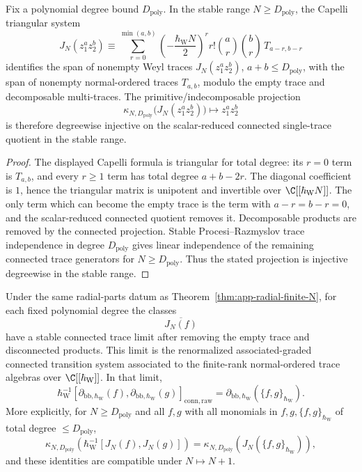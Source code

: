 \begin{lem}
\label{lem:app-radial-connected-projection}
  Fix a polynomial degree bound \(D_{\mathrm{poly}}\).  In the stable range
  \(N\geq D_{\mathrm{poly}}\), the Capelli triangular system
  \[
    J_N(z_1^az_2^b)\equiv
      \sum_{r=0}^{\min(a,b)}
        \left(-\frac{\hbar_{\mathrm{W}} N}{2}\right)^r
        r!\binom ar\binom br\,T_{a-r,b-r}
  \]
  identifies the span of nonempty Weyl traces \(J_N(z_1^az_2^b)\),
  \(a+b\leq D_{\mathrm{poly}}\), with the span of nonempty normal-ordered traces
  \(T_{a,b}\), modulo the empty trace and decomposable multi-traces.
  The primitive/indecomposable projection
  \[
    \kappa_{N,D_{\mathrm{poly}}}\bigl(J_N(z_1^az_2^b)\bigr)
      \longmapsto z_1^az_2^b
  \]
  is therefore degreewise injective on the scalar-reduced connected
  single-trace quotient in the stable range.
\end{lem}

\begin{proof}
  The displayed Capelli formula is triangular for total degree:
  its \(r=0\) term is \(T_{a,b}\), and every \(r\geq1\) term has total
  degree \(a+b-2r\).  The diagonal coefficient is \(1\), hence the
  triangular matrix is unipotent and invertible over
  \(\C[[\hbar_{\mathrm{W}} N]]\).  The only term which can become the empty trace is
  the term with \(a-r=b-r=0\), and the scalar-reduced connected quotient
  removes it.  Decomposable products are removed by the connected
  projection.  Stable Procesi--Razmyslov trace independence in degree
  \(D_{\mathrm{poly}}\) gives linear independence of the remaining connected trace
  generators for \(N\geq D_{\mathrm{poly}}\).  Thus the stated projection is injective
  degreewise in the stable range.
\end{proof}

\begin{thm}
\label{thm:app-radial-stable-connected}
  Under the same radial-parts datum as
  Theorem~\ref{thm:app-radial-finite-N}, for each fixed polynomial
  degree the classes
  \[
    \overline{J_N(f)}
  \]
  have a stable connected trace limit after removing the empty
  trace and disconnected products.  This limit is the renormalized
  associated-graded connected transition system associated to the
  finite-rank normal-ordered trace algebras over
  \(\C[[\hbar_{\mathrm{W}}]]\).  In that limit,
  \[
    \hbar_{\mathrm{W}}^{-1}[\partial_{\mathrm{bb},\hbar_{\mathrm{W}}}(f),
      \partial_{\mathrm{bb},\hbar_{\mathrm{W}}}(g)]_{\mathrm{conn,raw}}
      =
      \partial_{\mathrm{bb},\hbar_{\mathrm{W}}}(\{f,g\}_{\hbar_{\mathrm{W}}}).
  \]
  More explicitly, for \(N\geq D_{\mathrm{poly}}\) and all \(f,g\) with
  all monomials in \(f,g,\{f,g\}_{\hbar_{\mathrm{W}}}\) of total degree
  \(\leq D_{\mathrm{poly}}\),
  \[
    \kappa_{N,D_{\mathrm{poly}}}\!\left(
      \hbar_{\mathrm{W}}^{-1}[J_N(f),J_N(g)]
    \right)
    =
    \kappa_{N,D_{\mathrm{poly}}}\!\left(
      J_N(\{f,g\}_{\hbar_{\mathrm{W}}})
    \right),
  \]
  and these identities are compatible under \(N\mapsto N+1\).
\end{thm}

